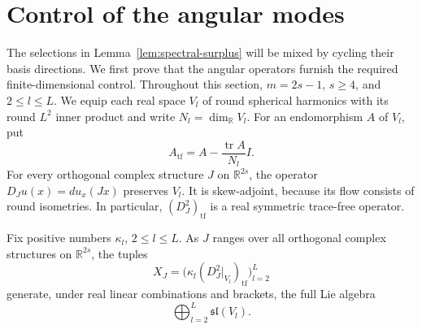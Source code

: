 \section{Control of the angular modes}
\label{sec:control}

The selections in Lemma~\ref{lem:spectral-surplus} will be mixed by
cycling their basis directions.  We first prove that the angular
operators furnish the required finite-dimensional control.  Throughout
this section, \(m=2s-1\), \(s\geq4\), and \(2\leq l\leq L\).  We equip
each real space \(V_l\) of round spherical harmonics with its round
\(L^2\) inner product and write \(N_l=\dim_{\mathbb R}V_l\).
For an endomorphism \(A\) of \(V_l\), put
\[
 A_{\mathrm{tf}}=A-\frac{\operatorname{tr}A}{N_l}I.
\]
For every orthogonal complex structure \(J\) on \(\mathbb R^{2s}\), the
operator \(D_Ju(x)=du_x(Jx)\) preserves \(V_l\).  It is skew-adjoint,
because its flow consists of round isometries.  In particular,
\((D_J^2)_{\mathrm{tf}}\) is a real symmetric trace-free operator.

\begin{proposition}
\label{prop:control}
Fix positive numbers \(\kappa_l\), \(2\leq l\leq L\).  As \(J\) ranges
over all orthogonal complex structures on \(\mathbb R^{2s}\), the tuples
\begin{equation}
 X_J=\bigl(\kappa_l(D_J^2|_{V_l})_{\mathrm{tf}}\bigr)_{l=2}^L
 \label{eq:control-generators}
\end{equation}
generate, under real linear combinations and brackets, the full Lie
algebra
\[
 \bigoplus_{l=2}^L\mathfrak{sl}(V_l).
\]
\end{proposition}

